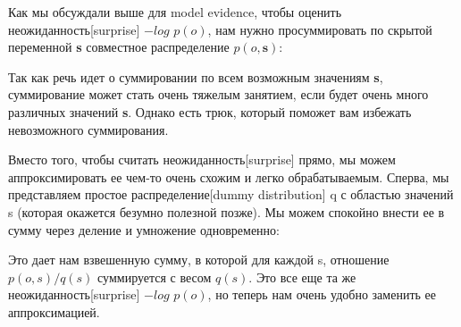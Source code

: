 \documentclass[twoside,leqno, 11pt]{article}
\begin{document}
	Как мы обсуждали выше для model evidence, чтобы оценить неожиданность[surprise] $-log$ $p(o)$, нам  нужно просуммировать по скрытой переменной \textbf{s} совместное распределение $p(o, \textbf{s})$:
	
	\begin{figure}[h!]
		\label{ris:image}
	\end{figure}
	
	Так как речь идет о суммировании по всем возможным значениям \textbf{s}, суммирование может стать очень тяжелым занятием, если будет очень много различных значений \textbf{s}. Однако есть трюк, который поможет вам избежать невозможного суммирования.
	
	Вместо того, чтобы считать неожиданность[surprise] прямо, мы можем аппроксимировать ее чем-то очень схожим и легко обрабатываемым. Сперва, мы представляем простое распределение[dummy distribution] q с областью значений s (которая окажется безумно полезной позже). Мы можем спокойно внести ее в сумму через деление и умножение одновременно: 
	
	\begin{figure}[h!]
		\label{ris:image}
	\end{figure}
	
	Это дает нам взвешенную сумму, в которой для каждой s, отношение $p(o, s)/q(s)$ суммируется с весом $q(s)$. Это все еще та же неожиданность[surprise] $-log$ $p(o)$, но теперь нам очень удобно заменить ее аппроксимацией.
	
\end{document}

